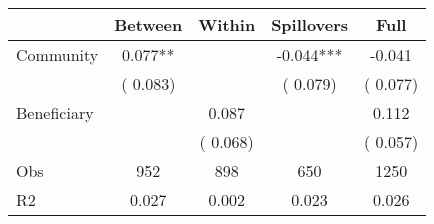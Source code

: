 
\begin{tabular}{l*{4}{c}}\hline&\multicolumn{1}{c}{Between}&\multicolumn{1}{c}{Within}&\multicolumn{1}{c}{Spillovers}&\multicolumn{1}{c}{Full}\\ \hline
 Community             &              0.077**      &                                               &       -0.044*** &        -0.041                            \\ 
                               &        (       0.083)           &                                       &       (       0.079)     &      (       0.077)                                           \\ 
 Beneficiary   &                                               &        0.087    &                                &             0.112                            \\ 
                               &                                               & (       0.068)                  &                                        &      (       0.057)                                           \\ 
\hline                                                                                                                                                                                                                                            
 Obs                   &               952               &       898                       &       650                &              1250                                               \\ 
 R2                    &                      0.027              &              0.002                      &              0.023               &                     0.026                                              \\ 
\hline \end{tabular}                                                                                                                                                                                                              